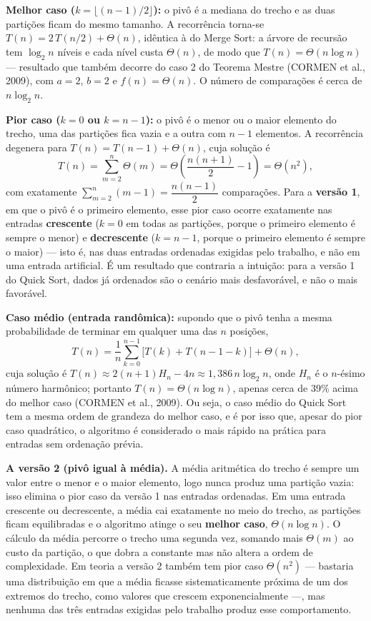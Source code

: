 \qquad \textbf{Melhor caso ($k = \lfloor (n-1)/2 \rfloor$):} o pivô é a
mediana do trecho e as duas partições ficam do mesmo tamanho. A
recorrência torna-se $T(n) = 2\,T(n/2) + \Theta(n)$, idêntica à do
Merge Sort: a árvore de recursão tem $\log_2 n$ níveis e cada nível
custa $\Theta(n)$, de modo que
$T(n) = \Theta(n \log n)$ --- resultado que também decorre do caso 2
do Teorema Mestre (CORMEN et al., 2009), com $a = 2$, $b = 2$ e
$f(n) = \Theta(n)$. O número de comparações é cerca de
$n \log_2 n$.

\qquad \textbf{Pior caso ($k = 0$ ou $k = n-1$):} o pivô é o menor ou o
maior elemento do trecho, uma das partições fica vazia e a outra com
$n-1$ elementos. A recorrência degenera para
$T(n) = T(n-1) + \Theta(n)$, cuja solução é
\[
T(n) = \sum_{m=2}^{n} \Theta(m) = \Theta\!\left(\frac{n(n+1)}{2} - 1\right) = \Theta(n^2),
\]
com exatamente
$\sum_{m=2}^{n} (m-1) = \dfrac{n(n-1)}{2}$ comparações. Para a
\textbf{versão 1}, em que o pivô é o primeiro elemento, esse pior caso
ocorre exatamente nas entradas \textbf{crescente} ($k = 0$ em todas as
partições, porque o primeiro elemento é sempre o menor) e
\textbf{decrescente} ($k = n-1$, porque o primeiro elemento é sempre o
maior) --- isto é, nas duas entradas ordenadas exigidas pelo trabalho,
e não em uma entrada artificial. É um resultado que contraria a
intuição: para a versão 1 do Quick Sort, dados já ordenados são o
cenário mais desfavorável, e não o mais favorável.

\qquad \textbf{Caso médio (entrada randômica):} supondo que o pivô tenha
a mesma probabilidade de terminar em qualquer uma das $n$ posições,
\[
T(n) = \frac{1}{n}\sum_{k=0}^{n-1}\big[T(k) + T(n-1-k)\big] + \Theta(n),
\]
cuja solução é $T(n) \approx 2(n+1)H_n - 4n \approx 1{,}386\,n\log_2 n$,
onde $H_n$ é o $n$-ésimo número harmônico; portanto
$T(n) = \Theta(n \log n)$, apenas cerca de 39\% acima do melhor caso
(CORMEN et al., 2009). Ou seja, o caso médio do Quick Sort tem a mesma
ordem de grandeza do melhor caso, e é por isso que, apesar do pior
caso quadrático, o algoritmo é considerado o mais rápido na prática
para entradas sem ordenação prévia.

\qquad \textbf{A versão 2 (pivô igual à média).} A média aritmética do
trecho é sempre um valor entre o menor e o maior elemento, logo nunca
produz uma partição vazia: isso elimina o pior caso da versão 1 nas
entradas ordenadas. Em uma entrada crescente ou decrescente, a média
cai exatamente no meio do trecho, as partições ficam equilibradas e o
algoritmo atinge o seu \textbf{melhor caso}, $\Theta(n \log n)$. O
cálculo da média percorre o trecho uma segunda vez, somando mais
$\Theta(m)$ ao custo da partição, o que dobra a constante mas não
altera a ordem de complexidade. Em teoria a versão 2 também tem pior
caso $\Theta(n^2)$ --- bastaria uma distribuição em que a média
ficasse sistematicamente próxima de um dos extremos do trecho, como
valores que crescem exponencialmente ---, mas nenhuma das três
entradas exigidas pelo trabalho produz esse comportamento.


